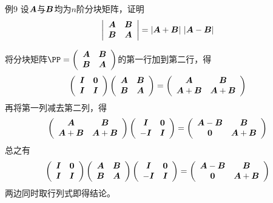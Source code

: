 \begin{frame}
  \begin{footnotesize}
    \begin{exampleblock}{例9}
      设$\boldsymbol{A}$与$\boldsymbol{B}$均为$n$阶分块矩阵，证明
      $$
      \left|
      \begin{array}{cc}
        \boldsymbol{A}&\boldsymbol{B}\\
        \boldsymbol{B}&\boldsymbol{A}
      \end{array}
      \right| = |\boldsymbol{A}+\boldsymbol{B}|~|\boldsymbol{A}-\boldsymbol{B}|
      $$
    \end{exampleblock}
    \pause
    \jiename
    将分块矩阵$
    \PP = 
    \left(
    \begin{array}{cc}
      \A&\B\\
      \B&\A
    \end{array}
    \right)$的第一行加到第二行，得
    $$
    \left(
    \begin{array}{cc}
      \boldsymbol{I} & \boldsymbol{0}\\
      \boldsymbol{I} & \boldsymbol{I}
    \end{array}
    \right) \left(
    \begin{array}{cc}
      \boldsymbol{A}&\boldsymbol{B}\\
      \boldsymbol{B}&\boldsymbol{A}
    \end{array}
    \right) = \left(
    \begin{array}{cc}
      \boldsymbol{A}&\boldsymbol{B}\\
      \boldsymbol{A}+\boldsymbol{B}&\boldsymbol{A}+\boldsymbol{B}
    \end{array}
    \right)
    $$\pause
    再将第一列减去第二列，得
    $$
    \left(
    \begin{array}{cc}
      \boldsymbol{A}&\boldsymbol{B}\\
      \boldsymbol{A}+\boldsymbol{B}&\boldsymbol{A}+\boldsymbol{B}
    \end{array}
    \right) \left(
    \begin{array}{cc}
      \boldsymbol{I}&\boldsymbol{0}\\
      -\boldsymbol{I}&\boldsymbol{I}
    \end{array}
    \right) = \left(
    \begin{array}{cc}
      \boldsymbol{A}-\boldsymbol{B} & \boldsymbol{B}\\
      \boldsymbol{0} & \boldsymbol{A}+\boldsymbol{B}
    \end{array}
    \right)
    $$\pause
    总之有
    $$
    \left(
    \begin{array}{cc}
      \boldsymbol{I} & \boldsymbol{0}\\
      \boldsymbol{I} & \boldsymbol{I}
    \end{array}
    \right) \left(
    \begin{array}{cc}
      \boldsymbol{A}&\boldsymbol{B}\\
      \boldsymbol{B}&\boldsymbol{A}
    \end{array}
    \right) 
    \left(
    \begin{array}{cc}
      \boldsymbol{I}&\boldsymbol{0}\\
      -\boldsymbol{I}&\boldsymbol{I}
    \end{array}
    \right) = \left(
    \begin{array}{cc}
      \boldsymbol{A}-\boldsymbol{B} & \boldsymbol{B}\\
      \boldsymbol{0} & \boldsymbol{A}+\boldsymbol{B}
    \end{array}
    \right)
    $$
    两边同时取行列式即得结论。
  \end{footnotesize}
\end{frame}
